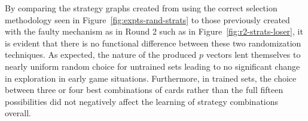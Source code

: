
By comparing the strategy graphs created from using the correct selection
methodology seen in Figure~\ref{fig:expts-rand-strats}
to those previously created with the faulty mechanism as in Round 2
such as in Figure~\ref{fig:r2-strats-loser},
it is evident that there is no functional difference between these two
randomization techniques.
%
As expected,
the nature of the produced $p$ vectors lent themselves to nearly uniform random
choice for untrained sets leading to no significant change in exploration in
early game situations.
%
Furthermore,
in trained sets,
the choice between three or four best combinations of cards rather than
the full fifteen possibilities did not negatively affect the learning of
strategy combinations overall.



